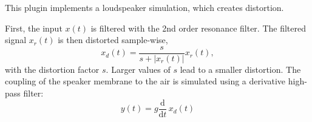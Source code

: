 This plugin implements a loudspeaker simulation, which creates distortion.

First, the input $x(t)$ is filtered with the 2nd order resonance
filter. The filtered signal $x_r(t)$ is then distorted sample-wise,
\begin{equation}
  x_d(t) = \frac{s}{s+|x_r(t)|} x_r(t),
\end{equation}
with the distortion factor $s$. Larger values of $s$ lead to a smaller
distortion. The coupling of the speaker membrane to the air is
simulated using a derivative high-pass filter:
\begin{equation}
  y(t) = g\frac{\textrm{d}}{\textrm{d}t}\,x_d(t)
\end{equation}





